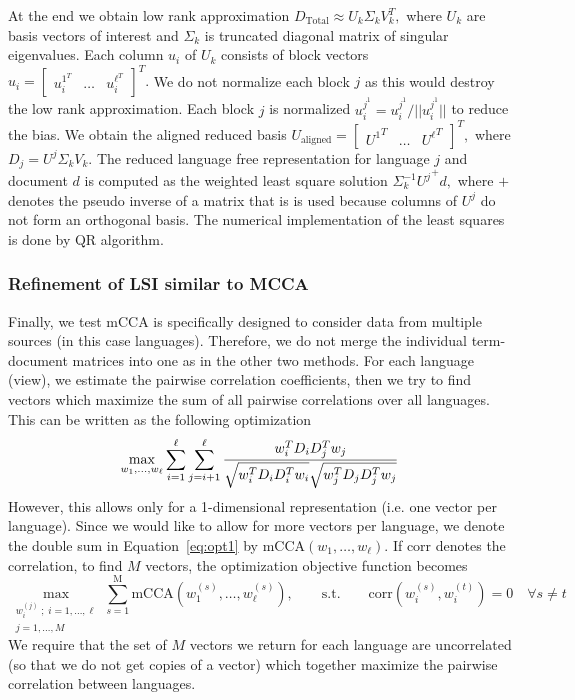 \documentclass[twoside,11pt]{article}
\begin{document}
At the end we obtain low rank approximation $D_{\mbox{Total}} \approx U_k \Sigma_k V_k^T,$ where $U_k$ are basis vectors of interest and $\Sigma_k$ is truncated diagonal matrix of singular eigenvalues. Each column $u_i$ of $U_k$ consists of block vectors $u_i = \begin{bmatrix} u^{1^T}_i & \dots & u^{\ell^T}_i \end{bmatrix}^T.$ We do not normalize each block $j$  as this would destroy the low rank approximation. Each block $j$ is normalized $u^{j^1}_i = u^{j^1}_i/||u^{j^1}_i||$ to reduce the bias. We obtain the aligned reduced basis $U_{\textrm{aligned}} = \begin{bmatrix} {U^1}^T &\dots & {U^\ell}^T \end{bmatrix}^T,$ where $D_j =  U^j \Sigma_k V_k.$ The reduced language free representation for language $j$ and document $d$ is computed as the weighted least square solution $\Sigma_k^{-1} {U^j}^+ d,$ where $+$ denotes the pseudo inverse of a matrix that is is used because columns of $U^j$ do not form an orthogonal basis. The numerical implementation of the least squares is done by QR algorithm.

\subsubsection{Refinement of LSI similar to MCCA}

Finally, we test mCCA is specifically designed to consider data from multiple sources (in this case languages). Therefore, we do not merge the individual term-document matrices into one as in
the other two methods. For each language (view), we estimate the pairwise correlation coefficients, then we try to find vectors which maximize the sum of all pairwise correlations over all languages. This can be written as the following optimization 
\begin{equation}
\label{eq:opt1}
\max_{w_1,\ldots, w_\ell} \sum_{i=1}^\ell\sum_{j=i+1}^\ell  \frac{w_i^T D_i D_j^T w_j}{\sqrt{ w_i^T D_i D_i^T w_i\vphantom{ D_j^T } }\sqrt{ w_j^T D_j D_j^T w_j}}
\end{equation}
However, this allows only for a 1-dimensional representation (i.e. one vector per language). Since we would like to allow for more vectors per language, we denote the double sum in Equation~\ref{eq:opt1} by $\mbox{mCCA}(w_1,\ldots,w_\ell)$. If $\mbox{corr}$ denotes the correlation, to find $M$ vectors, the optimization objective function  becomes
\begin{equation}
\max_{\substack{w_i^{(j)}\;;\;i=1,\ldots,\ell\\j=1,\ldots,M }}\sum_{s=1}^{\mbox{M}} \mbox{mCCA}\left(w_1^{(s)},\ldots,w_\ell^{(s)}\right),
\qquad\mbox{s.t.} \qquad \mbox{corr} \left(w_i^{(s)},w_i^{(t)}\right) = 0
\quad \forall s\neq t
\end{equation}
We require that the set of $M$ vectors we return for each language are uncorrelated (so that we do not get copies of a vector) which together maximize the pairwise correlation between languages.
\end{document}
